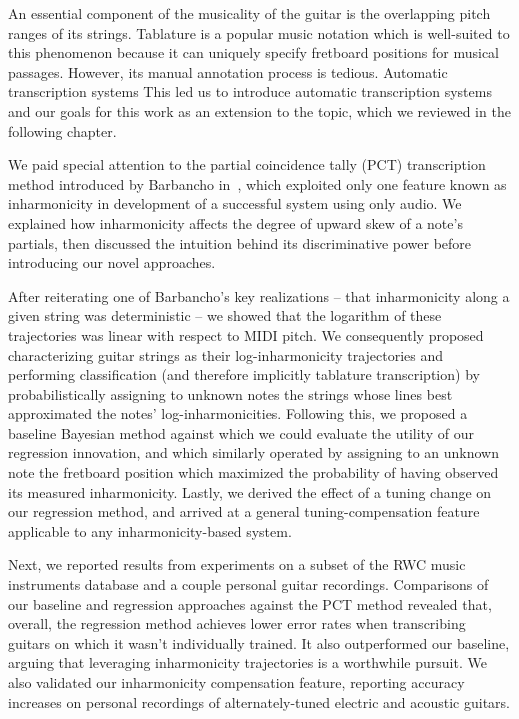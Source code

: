 \documentclass[convention,peer-reviewed]{aesconf}
\begin{document}
An essential component of the musicality of the guitar is the overlapping pitch ranges of its strings. Tablature is a popular music notation which is well-suited to this phenomenon because it can uniquely specify fretboard positions for musical passages. However, its manual annotation process is tedious. Automatic transcription systems This led us to introduce automatic transcription systems and our goals for this work as an extension to the topic, which we reviewed in the following chapter.

We paid special attention to the partial coincidence tally (PCT) transcription method introduced by Barbancho in~\cite{barbanchoi2012}, which exploited only one feature known as inharmonicity in development of a successful system using only audio. We explained how inharmonicity affects the degree of upward skew of a note's partials, then discussed the intuition behind its discriminative power before introducing our novel approaches.

After reiterating one of Barbancho's key realizations -- that inharmonicity along a given string was deterministic -- we showed that the logarithm of these trajectories was linear with respect to MIDI pitch. We consequently proposed characterizing guitar strings as their log-inharmonicity trajectories and performing classification (and therefore implicitly tablature transcription) by probabilistically assigning to unknown notes the strings whose lines best approximated the notes' log-inharmonicities. Following this, we proposed a baseline Bayesian method against which we could evaluate the utility of our regression innovation, and which similarly operated by assigning to an unknown note the fretboard position which maximized the probability of having observed its measured inharmonicity. Lastly, we derived the effect of a tuning change on our regression method, and arrived at a general tuning-compensation feature applicable to any inharmonicity-based system.

Next, we reported results from experiments on a subset of the RWC music instruments database and a couple personal guitar recordings. Comparisons of our baseline and regression approaches against the PCT method revealed that, overall, the regression method achieves lower error rates when transcribing guitars on which it wasn't individually trained. It also outperformed our baseline, arguing that leveraging inharmonicity trajectories is a worthwhile pursuit. We also validated our inharmonicity compensation feature, reporting accuracy increases on personal recordings of alternately-tuned electric and acoustic guitars.
\end{document}
